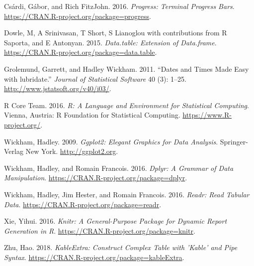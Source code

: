 \documentclass[]{article}
\begin{document}
\hypertarget{refs}{}
\hypertarget{ref-progress}{}
Csárdi, Gábor, and Rich FitzJohn. 2016. \emph{Progress: Terminal
Progress Bars}. \url{https://CRAN.R-project.org/package=progress}.

\hypertarget{ref-data.table}{}
Dowle, M, A Srinivasan, T Short, S Lianoglou with contributions from R
Saporta, and E Antonyan. 2015. \emph{Data.table: Extension of
Data.frame}. \url{https://CRAN.R-project.org/package=data.table}.

\hypertarget{ref-lubridate}{}
Grolemund, Garrett, and Hadley Wickham. 2011. ``Dates and Times Made
Easy with lubridate.'' \emph{Journal of Statistical Software} 40 (3):
1--25. \url{http://www.jstatsoft.org/v40/i03/}.

\hypertarget{ref-baseR}{}
R Core Team. 2016. \emph{R: A Language and Environment for Statistical
Computing}. Vienna, Austria: R Foundation for Statistical Computing.
\url{https://www.R-project.org/}.

\hypertarget{ref-ggplot2}{}
Wickham, Hadley. 2009. \emph{Ggplot2: Elegant Graphics for Data
Analysis}. Springer-Verlag New York. \url{http://ggplot2.org}.

\hypertarget{ref-dplyr}{}
Wickham, Hadley, and Romain Francois. 2016. \emph{Dplyr: A Grammar of
Data Manipulation}. \url{https://CRAN.R-project.org/package=dplyr}.

\hypertarget{ref-readr}{}
Wickham, Hadley, Jim Hester, and Romain Francois. 2016. \emph{Readr:
Read Tabular Data}. \url{https://CRAN.R-project.org/package=readr}.

\hypertarget{ref-knitr}{}
Xie, Yihui. 2016. \emph{Knitr: A General-Purpose Package for Dynamic
Report Generation in R}. \url{https://CRAN.R-project.org/package=knitr}.

\hypertarget{ref-kableExtra}{}
Zhu, Hao. 2018. \emph{KableExtra: Construct Complex Table with 'Kable'
and Pipe Syntax}. \url{https://CRAN.R-project.org/package=kableExtra}.
\end{document}
